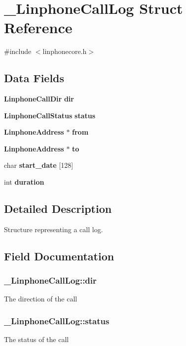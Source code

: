 \section{\-\_\-\-Linphone\-Call\-Log \-Struct \-Reference}
\label{struct__LinphoneCallLog}


{\ttfamily \#include $<$linphonecore.\-h$>$}

\subsection*{\-Data \-Fields}
\begin{DoxyCompactItemize}
\item 
{\bf \-Linphone\-Call\-Dir} {\bf dir}
\item 
{\bf \-Linphone\-Call\-Status} {\bf status}
\item 
{\bf \-Linphone\-Address} $\ast$ {\bf from}
\item 
{\bf \-Linphone\-Address} $\ast$ {\bf to}
\item 
char {\bf start\-\_\-date} [128]
\item 
int {\bf duration}
\end{DoxyCompactItemize}


\subsection{\-Detailed \-Description}
\-Structure representing a call log. 

\subsection{\-Field \-Documentation}
\subsubsection[{dir}]{ {\bf \-\_\-\-Linphone\-Call\-Log\-::dir}}\label{struct__LinphoneCallLog_a80b29b195febff1a54d0d3bc76dbfaed}
\-The direction of the call 
\subsubsection[{status}]{ {\bf \-\_\-\-Linphone\-Call\-Log\-::status}}\label{struct__LinphoneCallLog_a48b79800064f82a624584b175bcdac57}
\-The status of the call 
